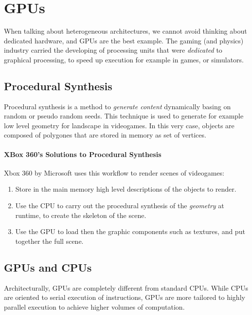 \documentclass[10pt,a4paper]{article}
\begin{document}
				
				
		\section{GPUs}
			When talking about heterogeneous architectures, we cannot avoid thinking about dedicated hardware, and GPUs are the best example. The gaming (and physics) industry carried the developing of processing units that were \emph{dedicated} to graphical processing, to speed up execution for example in games, or simulators.
			
			\subsection{Procedural Synthesis}
				Procedural synthesis is a method to \emph{generate content} dynamically basing on random or pseudo random seeds. This technique is used to generate for example low level geometry for landscape in videogames. In this very case, objects are composed of polygones that are stored in memory as set of vertices.
				
				\paragraph{XBox 360's Solutions to Procedural Synthesis}
					Xbox 360 by Microsoft uses this workflow to render scenes of videogames:
					\begin{enumerate}
						\item Store in the main memory high level descriptions of the objects to render.
						\item Use the CPU to carry out the procedural synthesis of the \emph{geometry} at runtime, to create the skeleton of the scene.
						\item Use the GPU to load then the graphic components such as textures, and put together the full scene.
					\end{enumerate}
			
			\subsection{GPUs and CPUs}
				Architecturally, GPUs are completely different from standard CPUs. While CPUs are oriented to serial execution of instructions, GPUs are more tailored to highly parallel execution to achieve higher volumes of computation.
				
\end{document}

